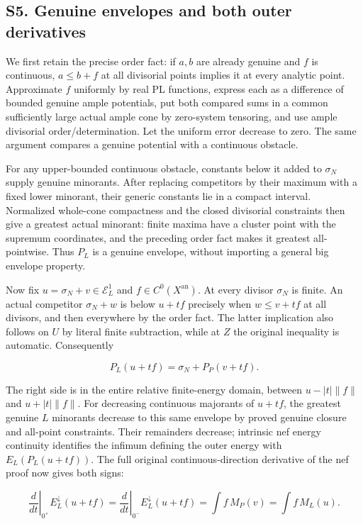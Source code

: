 \documentclass[
  10pt,
]{article}
\begin{document}
\subsection{S5. Genuine envelopes and both outer
derivatives}\label{s5.-genuine-envelopes-and-both-outer-derivatives}

We first retain the precise order fact: if \(a,b\) are already genuine
and \(f\) is continuous, \(a\leq b+f\) at all divisorial points implies
it at every analytic point. Approximate \(f\) uniformly by real PL
functions, express each as a difference of bounded genuine ample
potentials, put both compared sums in a common sufficiently large actual
ample cone by zero-system tensoring, and use ample divisorial
order/determination. Let the uniform error decrease to zero. The same
argument compares a genuine potential with a continuous obstacle.

For any upper-bounded continuous obstacle, constants below it added to
\(\sigma_N\) supply genuine minorants. After replacing competitors by
their maximum with a fixed lower minorant, their generic constants lie
in a compact interval. Normalized whole-cone compactness and the closed
divisorial constraints then give a greatest actual minorant: finite
maxima have a cluster point with the supremum coordinates, and the
preceding order fact makes it greatest all-pointwise. Thus \(P_L\) is a
genuine envelope, without importing a general big envelope property.

Now fix \(u=\sigma_N+v\in\mathcal E_L^1\) and
\(f\in C^0(X^{\mathrm{an}})\). At every divisor \(\sigma_N\) is finite.
An actual competitor \(\sigma_N+w\) is below \(u+tf\) precisely when
\(w\leq v+tf\) at all divisors, and then everywhere by the order fact.
The latter implication also follows on \(U\) by literal finite
subtraction, while at \(Z\) the original inequality is automatic.
Consequently

\[P_L(u+tf)=\sigma_N+P_P(v+tf).\]

The right side is in the entire relative finite-energy domain, between
\(u-|t|\|f\|\) and \(u+|t|\|f\|\). For decreasing continuous majorants
of \(u+tf\), the greatest genuine \(L\) minorants decrease to this same
envelope by proved genuine closure and all-point constraints. Their
remainders decrease; intrinsic nef energy continuity identifies the
infimum defining the outer energy with \(E_L(P_L(u+tf))\). The full
original continuous-direction derivative of the nef proof now gives both
signs:

\[\left.\frac d{dt}\right|_{0^+}E_L^\downarrow(u+tf)=\left.\frac d{dt}\right|_{0^-}E_L^\downarrow(u+tf)=\int f\,M_P(v)=\int f\,M_L(u).\]
\end{document}

